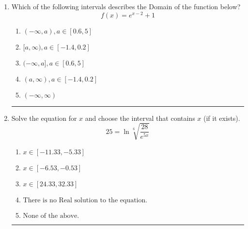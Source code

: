 \documentclass[14pt]{extbook}
\newcommand{\litem}[1]{\item#1\hspace*{-1cm}\rule{\textwidth}{0.4pt}}
\begin{document}
\begin{enumerate}
{\begin{enumerate}[label=\Alph*.]
\end{enumerate} }
\litem{
Which of the following intervals describes the Domain of the function below?\[ f(x) = e^{x-2}+1 \]\begin{enumerate}[label=\Alph*.]
\item \( (-\infty, a), a \in [0.6, 5] \)
\item \( [a, \infty), a \in [-1.4, 0.2] \)
\item \( (-\infty, a], a \in [0.6, 5] \)
\item \( (a, \infty), a \in [-1.4, 0.2] \)
\item \( (-\infty, \infty) \)

\end{enumerate} }
\litem{
 Solve the equation for $x$ and choose the interval that contains $x$ (if it exists).\[  25 = \ln{\sqrt[6]{\frac{28}{e^{5x}}}} \]\begin{enumerate}[label=\Alph*.]
\item \( x \in [-11.33, -5.33] \)
\item \( x \in [-6.53, -0.53] \)
\item \( x \in [24.33, 32.33] \)
\item \( \text{There is no Real solution to the equation.} \)
\item \( \text{None of the above.} \)

\end{enumerate} }
\end{enumerate}
\end{document}
